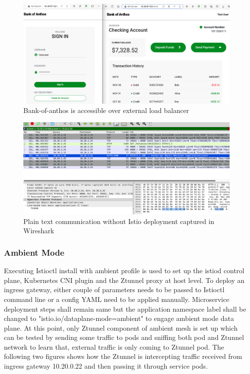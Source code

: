 \begin{figure}[ht!]
    \centering
    \includegraphics[width=1.0\linewidth]{resources/boa-view.png}
    \caption{Bank-of-anthos is accessible over external load balancer}
    \label{method:boaWebView}
\end{figure}

\begin{figure}[ht!]
    \centering
    \includegraphics[width=1.0\linewidth]{resources/raw-balance-value.png}
    \caption{Plain text communication without Istio deployment captured in Wireshark}
    \label{method:plainTxtWiresharkView}
\end{figure}

\subsubsection{Ambient Mode}
Executing Istioctl install with ambient profile is used to set up the istiod control plane, Kubernetes CNI plugin and the Ztunnel proxy at host level. To deploy an ingress gateway, either couple of parameters needs to be passed to Istioctl command line or a config YAML need to be applied manually. Microservice deployment steps shall remain same but the application namespace label shall be changed to "istio.io/dataplane-mode=ambient" to engage ambient mode data plane. At this point, only Ztunnel component of ambient mesh is set up which can be tested by sending some traffic to pods and sniffing both pod and Ztunnel network to learn that, external traffic is only coming to Ztunnel pod. The following two figures shows how the Ztunnel is intercepting traffic received from ingress gateway 10.20.0.22 and then passing it through service pods.

